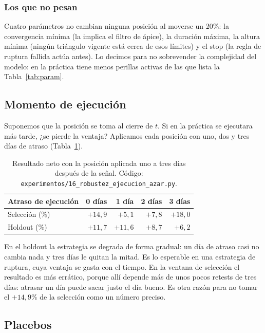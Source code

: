 \documentclass[10pt,a4paper]{article}
\newcommand{\ruta}[1]{\nolinkurl{#1}}
\begin{document}
\subsubsection{Los que no pesan}

Cuatro parámetros no cambian ninguna posición al moverse un 20\%: la convergencia mínima
(la implica el filtro de ápice), la duración máxima, la altura mínima (ningún triángulo
vigente está cerca de esos límites) y el stop (la regla de ruptura fallida actúa antes).
Lo decimos para no sobrevender la complejidad del modelo: en la práctica tiene menos
perillas activas de las que lista la Tabla~\ref{tab:param}.

\subsection{Momento de ejecución}\label{sec:rob_ejecucion}

Suponemos que la posición se toma al cierre de $t$. Si en la práctica se ejecutara más
tarde, ¿se pierde la ventaja? Aplicamos cada posición con uno, dos y tres días de atraso
(Tabla~\ref{tab:retraso}).

\begin{table}[htb]\centering\small
\begin{tabular}{@{}lrrrr@{}}
\toprule
Atraso de ejecución & 0 días & 1 día & 2 días & 3 días \\
\midrule
Selección (\%) & $+14{,}9$ & $+5{,}1$ & $+7{,}8$ & $+18{,}0$ \\
Holdout (\%)   & $+11{,}7$ & $+11{,}6$ & $+8{,}7$ & $+6{,}2$ \\
\bottomrule
\end{tabular}
\caption{Resultado neto con la posición aplicada uno a tres días después de la señal.
Código: \ruta{experimentos/16_robustez_ejecucion_azar.py}.}\label{tab:retraso}
\end{table}

En el holdout la estrategia se degrada de forma gradual: un día de atraso casi no
cambia nada y tres días le quitan la mitad. Es lo esperable en una estrategia de
ruptura, cuya ventaja se gasta con el tiempo. En la ventana de selección el resultado es
más errático, porque allí depende más de unos pocos retests de tres días: atrasar un día
puede sacar justo el día bueno. Es otra razón para no tomar el $+14{,}9\%$ de la
selección como un número preciso.

\subsection{Placebos}\label{sec:rob_placebo}
\end{document}
